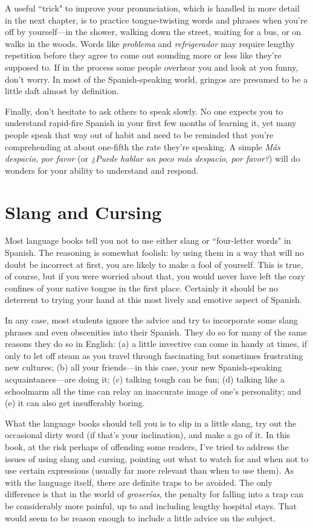 A useful ``trick" to improve your pronunciation, which is
handled in more detail in the next chapter, is to practice tongue-twisting words and phrases when you're off by yourself---in the
shower, walking down the street, waiting for a bus, or on walks in the
woods. Words like \emph{problema} and \emph{refrigerador} may require lengthy
repetition before they agree to come out sounding more or less like
they're supposed to. If in the process some people overhear you and
look at you funny, don't worry. In most of the Spanish-speaking world,
gringos are presumed to be a little daft almost by definition.

Finally, don't hesitate to ask others to speak slowly. No one
expects you to understand rapid-fire Spanish in your first few months
of learning it, yet many people speak that way out of habit and need to
be reminded that you're comprehending at about one-fifth the rate
they're speaking. A simple \emph{Más despacio, por favor} (or \emph{¿Puede hablar
un poco más despacio, por favor?}) will do wonders for your ability to
understand and respond.

\section{Slang and Cursing}

Most language books tell you not to use either slang or ``four-letter words" in Spanish. The reasoning is somewhat foolish: by using
them in a way that will no doubt be incorrect at first, you are likely to
make a fool of yourself. This is true, of course, but if you were worried
about that, you would never have left the cozy confines of your native
tongue in the first place. Certainly it should be no deterrent to trying
your hand at this most lively and emotive aspect of Spanish.

In any case, most students ignore the advice and try to incorporate some slang phrases and even obscenities into their Spanish.
They do so for many of the same reasons they do so in English: (a) a
little invective can come in handy at times, if only to let off steam as
you travel through fascinating but sometimes frustrating new cultures;
(b) all your friends---in this case, your new Spanish-speaking acquaintances---are doing it; (c) talking tough can be fun; (d) talking like a
schoolmarm all the time can relay an inaccurate image of one's personality; and (e) it can also get insufferably boring.

What the language books should tell you is to slip in a little
slang, try out the occasional dirty word (if that's your inclination), and
make a go of it. In this book, at the risk perhaps of offending some
readers, I've tried to address the issues of using slang and cursing,
pointing out what to watch for and when not to use certain expressions (usually far more relevant than when to use them). As with the
language itself, there are definite traps to be avoided. The only difference is that in the world of \emph{groserías}, the penalty for falling into a trap
can be considerably more painful, up to and including lengthy hospital
stays. That would seem to be reason enough to include a little advice
on the subject.

